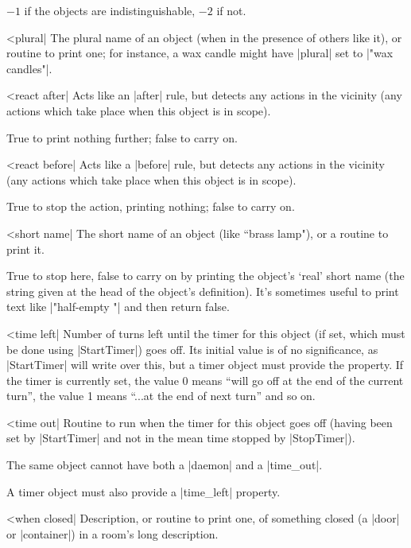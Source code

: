 {{{\rr $-1$ if the objects are indistinguishable, $-2$ if not.

^^|plural|
\fo The plural name of an object (when in the presence of others like it),
or routine to print one; for instance, a wax candle might have |plural| set
to |"wax candles"|.

\nrr

^^|react after|
\fo Acts like an |after| rule, but detects any actions in the vicinity
(any actions which take place when this object is in scope).

\rr True to print nothing further; false to carry on.

^^|react before|
\fo Acts like a |before| rule, but detects any actions in the vicinity
(any actions which take place when this object is in scope).

\rr True to stop the action, printing nothing; false to carry on.

^^|short name|
\fo The short name of an object (like ``brass lamp"), or a routine to print
it.

\rr True to stop here, false to carry on by printing the object's `real'
short name (the string given at the head of the object's definition).  It's
sometimes useful to print text like |"half-empty "| and then return false.

^^|time left|
Number of turns left until the timer for this object (if set, which must be
done using |StartTimer|) goes off.  Its initial value is of no significance,
as |StartTimer| will write over this, but a timer object must provide the
property.  If the timer is currently set, the value 0 means ``will go off
at the end of the current turn'', the value 1 means ``...at the end of
next turn'' and so on.

^^|time out|
Routine to run when the timer for this object goes off (having been set by
|StartTimer| and not in the mean time stopped by |StopTimer|).

\warn The same object cannot have both a |daemon| and a |time_out|.

\warn A timer object must also provide a |time_left| property.

^^|when closed|
\fo Description, or routine to print one, of something closed (a |door| or
|container|) in a room's long description.

\nrr

}}}
